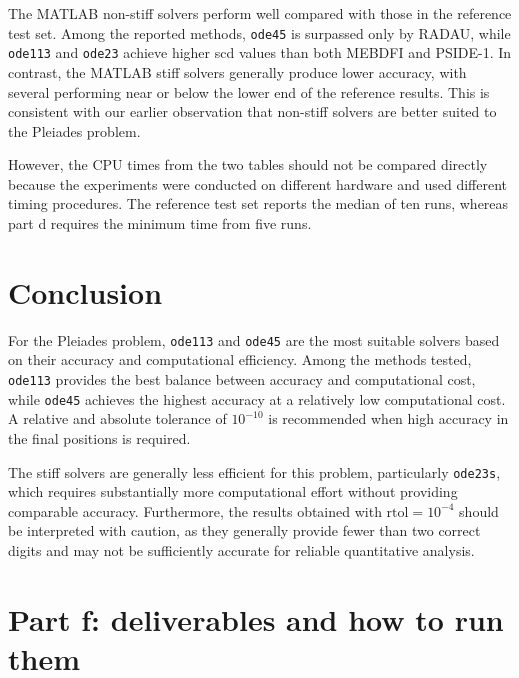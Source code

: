 \documentclass[11pt]{article}
\begin{document}
The MATLAB non-stiff solvers perform well compared with those
in the reference test set. Among the reported methods,
\texttt{ode45} is surpassed only by RADAU, while
\texttt{ode113} and \texttt{ode23} achieve higher scd
values than both MEBDFI and PSIDE-1. In contrast, the
MATLAB stiff solvers generally produce lower accuracy,
with several performing near or below the lower end of
the reference results. This is consistent with our
earlier observation that non-stiff solvers are better
suited to the Pleiades problem.

However, the CPU times from the two tables should not
be compared directly because the experiments were conducted
on different hardware and used different timing procedures.
The reference test set reports the median of ten runs,
whereas part d requires the minimum time from five runs.

\section{Conclusion}
For the Pleiades problem, \texttt{ode113} and \texttt{ode45}
are the most suitable solvers based on their accuracy and
computational efficiency. Among the methods tested,
\texttt{ode113} provides the best balance between accuracy
and computational cost, while \texttt{ode45} achieves the
highest accuracy at a relatively low computational cost.
A relative and absolute tolerance of $10^{-10}$ is
recommended when high accuracy in the final positions
is required.

The stiff solvers are generally less efficient for this
problem, particularly \texttt{ode23s}, which requires
substantially more computational effort without providing
comparable accuracy. Furthermore, the results obtained
with $\mathrm{rtol}=10^{-4}$ should be interpreted with
caution, as they generally provide fewer than two correct
digits and may not be sufficiently accurate for reliable
quantitative analysis.

\section{Part f: deliverables and how to run them}
\end{document}
